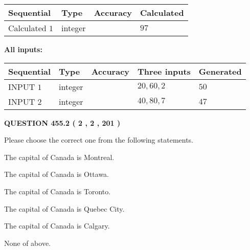 \documentclass[12pt]{article}
\begin{document}
   
\noindent{}
   
   
  
  
\noindent\begin{tabular}{|l|l|l|l|}
\hline
 Sequential & Type & Accuracy & Calculated \\ 
\hline
 
 
  Calculated $  1 $ & integer &  & 
  $ 97 $ 
 \\  \hline  
 \end{tabular}
   
   
   
   
\noindent\vspace{0.1in}\hspace{-0.08in} {\textbf{\Large{All inputs: }}}
   
   
  
  
\noindent\begin{tabular}{|l|l|l|l|l|}
\hline
 Sequential & Type & Accuracy & Three inputs & Generated \\ 
\hline
 
 
  INPUT $  1 $ & integer &  & $
 20
 , 
 60
 , 
 2
 $ & $ 50 $ 
 \\  \hline  
 
 
  INPUT $  2 $ & integer &  & $
 40
 , 
 80
 , 
 7
 $ & $ 47 $ 
 \\  \hline  
 \end{tabular}
   
   
  
\vspace{0.2in}
  
{\textbf{\Large{QUESTION
455.2 
 ( 2 , 2 , 201 )
}}}
  
  
Please choose the correct one from the following statements.
 
 
The capital of Canada is Montreal.
 
 
The capital of Canada is Ottawa.
 
 
The capital of Canada is Toronto.
 
 
The capital of Canada is Quebec City.
 
 
The capital of Canada is Calgary.
 
 
 None of above.
 
 
\noindent{}
 
\end{document}
